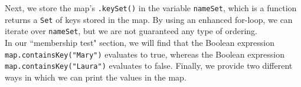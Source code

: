 Next, we store the map's \verb!.keySet()! in the variable \verb!nameSet!, which is a function returns a \verb!Set! of keys stored in the map. By using an enhanced for-loop, we can iterate over \verb!nameSet!, but we are not guaranteed any type of ordering. \\

In our ``membership test" section, we will find that the Boolean expression \verb!map.containsKey("Mary")! evaluates to true, whereas the Boolean expression \verb!map.containsKey("Laura")! evaluates to false. Finally, we provide two different ways in which we can print the values in the map. 


